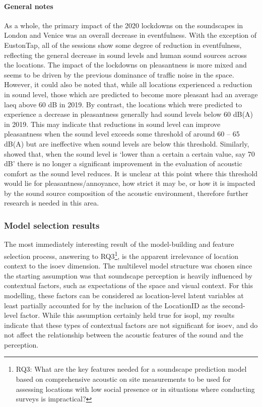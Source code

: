    \paragraph*{General notes} As a whole, the primary impact of the 2020 lockdowns on the soundscapes in London and Venice was an overall decrease in eventfulness. With the exception of EustonTap, all of the sessions show some degree of reduction in eventfulness, reflecting the general decrease in sound levels and human sound sources across the locations. The impact of the lockdowns on pleasantness is more mixed and seems to be driven by the previous dominance of traffic noise in the space. However, it could also be noted that, while all locations experienced a reduction in sound level, those which are predicted to become more pleasant had an average \gls{laeq} above 60 dB in 2019. By contrast, the locations which were predicted to experience a decrease in pleasantness generally had sound levels below 60 dB(A) in 2019. This may indicate that reductions in sound level can improve pleasantness when the sound level exceeds some threshold of around 60 -- 65 dB(A) but are ineffective when sound levels are below this threshold. Similarly, \citet{Yang2005Acoustic} showed that, when the sound level is `lower than a certain a certain value, say 70 dB' there is no longer a significant improvement in the evaluation of acoustic comfort as the sound level reduces. It is unclear at this point where this threshold would lie for pleasantness/annoyance, how strict it may be, or how it is impacted by the sound source composition of the acoustic environment, therefore further research is needed in this area.

   \subsubsection{Model selection results}

   The most immediately interesting result of the model-building and feature selection process, answering to RQ3\footnote{RQ3: What are the key features needed for a soundscape prediction model based on comprehensive acoustic on site measurements to be used for assessing locations with low social presence or in situations where conducting surveys is impractical?}, is the apparent irrelevance of location context to the \gls{isoev} dimension. The multilevel model structure was chosen since the starting assumption was that soundscape perception is heavily influenced by contextual factors, such as expectations of the space and visual context. For this modelling, these factors can be considered as location-level latent variables at least partially accounted for by the inclusion of the LocationID as the second-level factor. While this assumption certainly held true for \gls{isopl}, my results indicate that these types of contextual factors are not significant for \gls{isoev}, and do not affect the relationship between the acoustic features of the sound and the perception.

